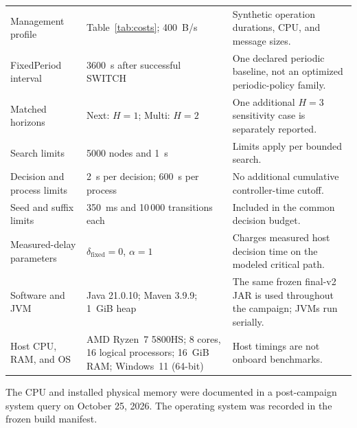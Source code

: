 \documentclass[conference]{IEEEtran}
\newcommand{\FinalHostHardware}{%
    AMD Ryzen~7 5800HS;
    8 cores, 16 logical processors;
    16~GiB RAM;
    Windows~11 (64-bit)%
}
\begin{document}
\begin{table}[!t]
\begin{tabularx}{\textwidth}{
        @{}
        p{}
        p{}
        Y
        @{}
    }
        Management profile
        &
        Table~\ref{tab:costs}; 400~B/s
        &
        Synthetic operation durations, CPU, and message sizes.
        \\

        FixedPeriod interval
        &
        3600~s after successful SWITCH
        &
        One declared periodic baseline, not an optimized
        periodic-policy family.
        \\

        Matched horizons
        &
        Next: $H=1$; Multi: $H=2$
        &
        One additional $H=3$ sensitivity case is separately
        reported.
        \\

        Search limits
        &
        5000 nodes and 1~s
        &
        Limits apply per bounded search.
        \\

        Decision and process limits
        &
        2~s per decision; 600~s per process
        &
        No additional cumulative controller-time cutoff.
        \\

        Seed and suffix limits
        &
        350~ms and 10\,000 transitions each
        &
        Included in the common decision budget.
        \\

        Measured-delay parameters
        &
        $\delta_{\mathrm{fixed}}=0$, $\alpha=1$
        &
        Charges measured host decision time on the modeled
        critical path.
        \\

        Software and JVM
        &
        Java 21.0.10; Maven 3.9.9; 1~GiB heap
        &
        The same frozen final-v2 JAR is used throughout
        the campaign; JVMs run serially.
        \\

        Host CPU, RAM, and OS
        &
        \FinalHostHardware
        &
        Host timings are not onboard benchmarks.
        \\

        \bottomrule
    \end{tabularx}
\end{table}

The CPU and installed physical memory were documented
in a post-campaign system query on October 25, 2026.
The operating system was recorded in the frozen build manifest.
\end{document}
